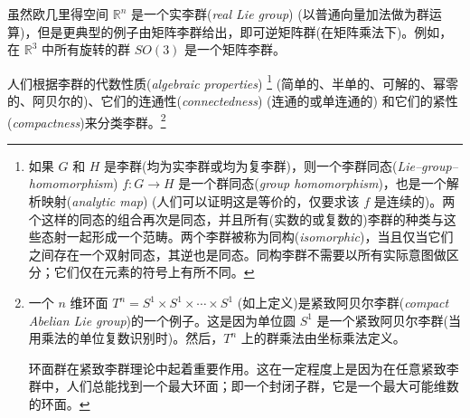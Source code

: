 \documentclass[11pt,fontset=founder]{ctexart}
\begin{document}
虽然欧几里得空间 $\mathbb{R}^{n}$ 是一个实李群(\textit{real Lie group}) (以普通向量加法做为群运算)，但是更典型的例子由矩阵李群给出，即可逆矩阵群(在矩阵乘法下)。例如，在 $\mathbb{R}^{3}$ 中所有旋转的群 $SO(3)$ 是一个矩阵李群。

人们根据李群的代数性质(\textit{algebraic properties})%
\footnote{%
如果 $G$ 和 $H$ 是李群(均为实李群或均为复李群)，则一个李群同态(\textit{Lie--group--homomorphism}) $f:G\rightarrow H$ 是一个群同态(\textit{group homomorphism})，也是一个解析映射(\textit{analytic map}) (人们可以证明这是等价的，仅要求该 $f$ 是连续的)。两个这样的同态的组合再次是同态，并且所有(实数的或复数的)李群的种类与这些态射一起形成一个范畴。两个李群被称为同构(\textit{isomorphic})，当且仅当它们之间存在一个双射同态，其逆也是同态。同构李群不需要以所有实际意图做区分；它们仅在元素的符号上有所不同。} (简单的、半单的、可解的、幂零的、阿贝尔的)、它们的连通性(\textit{connectedness}) (连通的或单连通的) 和它们的紧性(\textit{compactness})来分类李群。\footnote{%
一个 $n$ 维环面 $T^n=S^1 \times S^1\times\cdots\times S^1$ (如上定义)是紧致阿贝尔李群(\textit{compact Abelian Lie group})的一个例子。这是因为单位圆 $S^1$ 是一个紧致阿贝尔李群(当用乘法的单位复数识别时)。然后，$T^n$ 上的群乘法由坐标乘法定义。
\par
环面群在紧致李群理论中起着重要作用。这在一定程度上是因为在任意紧致李群中，人们总能找到一个最大环面；即一个封闭子群，它是一个最大可能维数的环面。}
\end{document}
